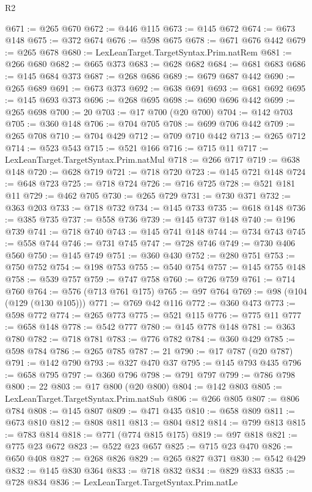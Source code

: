 \begin{lexlean}{R2}
\begin{coremodule}
@671 := @265 @670
@672 := @446 @115
@673 := @145 @672
@674 := @673 @148
@675 := @372 @674
@676 := @598 @675
@678 := @671 @676 @442
@679 := @265 @678
@680 := LexLeanTarget.TargetSyntax.Prim.natRem
@681 := @266 @680
@682 := @665 @373
@683 := @628 @682
@684 := @681 @683
@686 := @145 @684 @373
@687 := @268 @686
@689 := @679 @687 @442
@690 := @265 @689
@691 := @673 @373
@692 := @638 @691
@693 := @681 @692
@695 := @145 @693 @373
@696 := @268 @695
@698 := @690 @696 @442
@699 := @265 @698
@700 := 20
@703 := @17 @700 (@20 @700)
@704 := @142 @703
@705 := @360 @148
@706 := @704 @705
@708 := @699 @706 @442
@709 := @265 @708
@710 := @704 @429
@712 := @709 @710 @442
@713 := @265 @712
@714 := @523 @543
@715 := @521 @166
@716 := @715 @11
@717 := LexLeanTarget.TargetSyntax.Prim.natMul
@718 := @266 @717
@719 := @638 @148
@720 := @628 @719
@721 := @718 @720
@723 := @145 @721 @148
@724 := @648 @723
@725 := @718 @724
@726 := @716 @725
@728 := @521 @181 @11
@729 := @462 @705
@730 := @265 @729
@731 := @730 @371
@732 := @363 @203
@733 := @718 @732
@734 := @145 @733
@735 := @618 @148
@736 := @385 @735
@737 := @558 @736
@739 := @145 @737 @148
@740 := @196 @739
@741 := @718 @740
@743 := @145 @741 @148
@744 := @734 @743
@745 := @558 @744
@746 := @731 @745
@747 := @728 @746
@749 := @730 @406 @560
@750 := @145 @749
@751 := @360 @430
@752 := @280 @751
@753 := @750 @752
@754 := @198 @753
@755 := @540 @754
@757 := @145 @755 @148
@758 := @539 @757
@759 := @747 @758
@760 := @726 @759
@761 := @714 @760
@764 := @576 (@713 @761 @175)
@765 := @97 @764
@769 := @98 (@104 (@129 (@130 @105)))
@771 := @769 @42 @116
@772 := @360 @473
@773 := @598 @772
@774 := @265 @773
@775 := @521 @115
@776 := @775 @11
@777 := @658 @148
@778 := @542 @777
@780 := @145 @778 @148
@781 := @363 @780
@782 := @718 @781
@783 := @776 @782
@784 := @360 @429
@785 := @598 @784
@786 := @265 @785
@787 := 21
@790 := @17 @787 (@20 @787)
@791 := @142 @790
@793 := @327 @470 @37
@795 := @145 @793 @435
@796 := @658 @795
@797 := @360 @796
@798 := @791 @797
@799 := @786 @798
@800 := 22
@803 := @17 @800 (@20 @800)
@804 := @142 @803
@805 := LexLeanTarget.TargetSyntax.Prim.natSub
@806 := @266 @805
@807 := @806 @784
@808 := @145 @807
@809 := @471 @435
@810 := @658 @809
@811 := @673 @810
@812 := @808 @811
@813 := @804 @812
@814 := @799 @813
@815 := @783 @814
@818 := @771 (@774 @815 @175)
@819 := @97 @818
@821 := @775 @23 @672
@823 := @522 @23 @657
@825 := @715 @23 @470
@826 := @650 @408
@827 := @268 @826
@829 := @265 @827 @371
@830 := @542 @429
@832 := @145 @830 @364
@833 := @718 @832
@834 := @829 @833
@835 := @728 @834
@836 := LexLeanTarget.TargetSyntax.Prim.natLe

\end{coremodule}
\end{lexlean}

